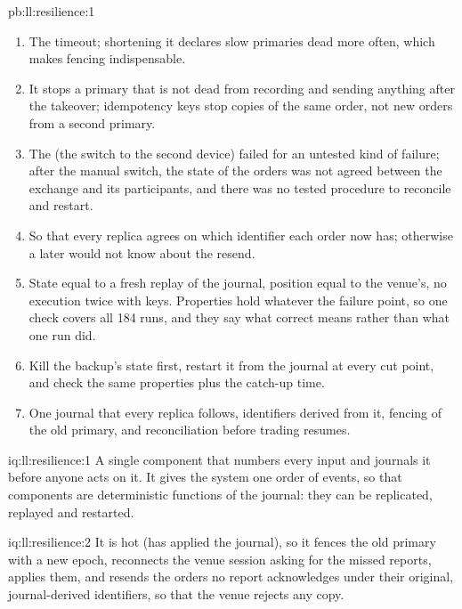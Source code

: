 \begin{solution}{pb:ll:resilience:1}
\begin{enumerate}
at a random time in the scenario, pushing the position to 1\,100 against a limit of 1\,000; with idempotency keys, none; and
recovery took 2.8 to \qty{3.1}{\milli\second}, almost all of it the  timeout.
\item The  timeout; shortening it declares slow primaries dead more often, which makes fencing indispensable.
\item It stops a primary that is not dead from recording and sending anything after the takeover; idempotency keys stop copies
of the same order, not new orders from a second primary.
\item The  (the switch to the second device) failed for an untested kind of failure; after the manual switch, the state
of the orders was not agreed between the exchange and its participants, and there was no tested procedure to reconcile and
restart.
\item So that every replica agrees on which identifier each order now has; otherwise a later  would not know about the
resend.
\item State equal to a fresh replay of the journal, position equal to the venue's, no execution twice with keys. Properties hold
whatever the failure point, so one check covers all 184 runs, and they say what correct means rather than what one run did.
\item Kill the backup's state first, restart it from the journal at every cut point, and check the same properties plus the
catch-up time.
\item One journal that every replica follows, identifiers derived from it, fencing of the old primary, and reconciliation before
trading resumes.
\end{enumerate}
\end{solution}

\begin{solution}{iq:ll:resilience:1}
A single component that numbers every input and journals it before anyone acts on it. It gives the system one order of events,
so that components are deterministic functions of the journal: they can be replicated, replayed and restarted.
\end{solution}

\begin{solution}{iq:ll:resilience:2}
It is hot (has applied the journal), so it fences the old primary with a new epoch, reconnects the venue session asking for the
missed reports, applies them, and resends the orders no report acknowledges under their original, journal-derived identifiers,
so that the venue rejects any copy.
\end{solution}

